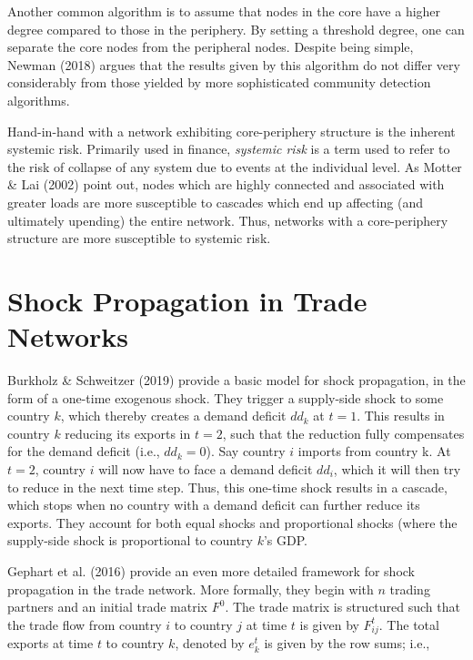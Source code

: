 \documentclass[12pt,letterpaper]{report}
\begin{document}
	Another common algorithm is to assume that nodes in the core have a higher degree compared to those in the periphery. By setting a threshold degree, one can separate the core nodes from the peripheral nodes. Despite being simple, Newman (2018) argues that the results given by this algorithm do not differ very considerably from those yielded by more sophisticated community detection algorithms. 

	Hand-in-hand with a network exhibiting core-periphery structure is the inherent systemic risk. Primarily used in finance, \textit{systemic risk} is a term used to refer to the risk of collapse of any system due to events at the individual level. As Motter \& Lai (2002) point out, nodes which are highly connected and associated with greater loads are more susceptible to cascades which end up affecting (and ultimately upending) the entire network. Thus, networks with a  core-periphery structure are more susceptible to systemic risk.
	
	\section{Shock Propagation in Trade Networks}
	\label{sec:33ShockPropagation}
	
	Burkholz \& Schweitzer (2019) provide a basic model for shock propagation, in the form of a one-time exogenous shock. They trigger a supply-side shock to some country $k$, which thereby creates a demand deficit $dd_k$ at $t = 1$. This results in country $k$ reducing its exports in $t = 2$, such that the reduction fully compensates for the demand deficit (i.e., $dd_k = 0$). Say country $i$ imports from country k. At $t = 2$, country $i$ will now have to face a demand deficit $dd_i$, which it will then try to reduce in the next time step. Thus, this one-time shock results in a cascade, which stops when no country with a demand deficit can further reduce its exports. They account for both equal shocks and proportional shocks (where the supply-side shock is proportional to country $k$’s GDP.
	
	Gephart et al. (2016) provide an even more detailed framework for shock propagation in the trade network. More formally, they begin with $n$ trading partners and an initial trade matrix $F^{0}$. The trade matrix is structured such that the trade flow from country $i$ to country $j$ at time $t$ is given by $F_{ij}^{t}$. The total exports at time $t$ to country $k$, denoted by $e_{k}^{t}$ is given by the row sums; i.e., 
	
\end{document}
